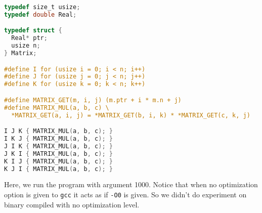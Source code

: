 \documentclass[12pt]{article}
\begin{document}
\begin{lstlisting}[language=C]
typedef size_t usize;
typedef double Real;

typedef struct {
  Real* ptr;
  usize n;
} Matrix;

#define I for (usize i = 0; i < n; i++)
#define J for (usize j = 0; j < n; j++)
#define K for (usize k = 0; k < n; k++)

#define MATRIX_GET(m, i, j) (m.ptr + i * m.n + j)
#define MATRIX_MUL(a, b, c) \
  *MATRIX_GET(a, i, j) = *MATRIX_GET(b, i, k) * *MATRIX_GET(c, k, j)

I J K { MATRIX_MUL(a, b, c); }
I K J { MATRIX_MUL(a, b, c); }
J I K { MATRIX_MUL(a, b, c); }
J K I { MATRIX_MUL(a, b, c); }
K I J { MATRIX_MUL(a, b, c); }
K J I { MATRIX_MUL(a, b, c); }
\end{lstlisting}

Here, we run the program with argument 1000.
Notice that when no optimization option is given to \lstinline{gcc} it acts as if \lstinline{-O0} is given.
So we didn't do experiment on binary compiled with no optimization level.
\end{document}
